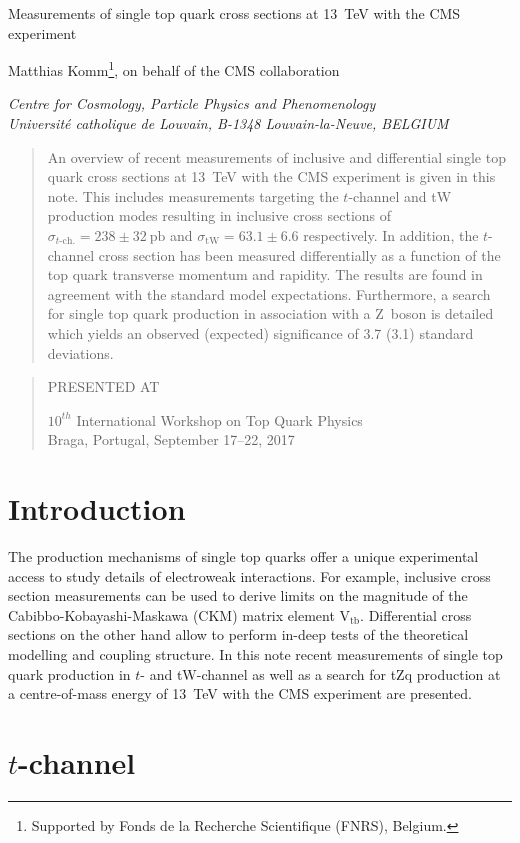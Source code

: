 \documentclass[12pt]{article}
\newcommand\pubnumber{}
\newcommand\pubdate{\today}
\def\institute{Centre for Cosmology, Particle Physics and Phenomenology\\
Universit\'e catholique de Louvain, B-1348 Louvain-la-Neuve, BELGIUM}
\def\support{\footnote{Supported by Fonds de la Recherche Scientifique (FNRS), Belgium.}}
\def\Title#1{\begin{center} {\Large #1 } \end{center}}
\def\Author#1{\begin{center}{ \sc #1} \end{center}}
\def\Address#1{\begin{center}{ \it #1} \end{center}}
\newcommand\pubblock{\rightline{\begin{tabular}{l} \pubnumber\\
         \pubdate  \end{tabular}}}
\newenvironment{Abstract}{\begin{quotation}  }{\end{quotation}}
\newenvironment{Presented}{\begin{quotation} \begin{center} 
             PRESENTED AT\end{center}\bigskip 
      \begin{center}\begin{large}}{\end{large}\end{center} \end{quotation}}
\begin{document}
\begin{titlepage}
\pubblock

\vfill
\Title{Measurements of single top quark cross sections at 13~TeV with the CMS experiment}
\vfill
\Author{Matthias Komm\support, on behalf of the CMS collaboration}
\Address{\institute}
\vfill
\begin{Abstract}
An overview of recent measurements of inclusive and differential single top quark cross sections at 13~TeV with the CMS experiment is given in this note. This includes measurements targeting the $t$-channel and tW production modes resulting in inclusive cross sections of $\sigma_{t\mathrm{\mbox{-}ch.}}=238\pm32~\mathrm{pb}$ and $\sigma_\mathrm{tW}=63.1\pm6.6$ respectively. In addition, the $t$-channel cross section has been measured differentially as a function of the top quark transverse momentum and rapidity. The results are found in agreement with the standard model expectations. Furthermore, a search for single top quark production in association with a Z~boson is detailed which yields an observed (expected) significance of 3.7 (3.1) standard deviations. 
\end{Abstract}
\vfill
\begin{Presented}
$10^{th}$ International Workshop on Top Quark Physics\\
Braga, Portugal,  September 17--22, 2017
\end{Presented}
\vfill
\end{titlepage}
\def\thefootnote{\fnsymbol{footnote}}
\setcounter{footnote}{0}
%

\section{Introduction}

The production mechanisms of single top quarks offer a unique experimental access to study details of electroweak interactions. For example, inclusive cross section measurements can be used to derive limits on the magnitude of the Cabibbo-Kobayashi-Maskawa (CKM) matrix element $\mathrm{V}_\mathrm{tb}$. Differential cross sections on the other hand allow to perform in-deep tests of the theoretical modelling and coupling structure. In this note recent measurements of single top quark production in $t$- and tW-channel as well as a search for tZq production at a centre-of-mass energy of 13~TeV with the CMS experiment are presented.


\section{$t$-channel}
\end{document}
